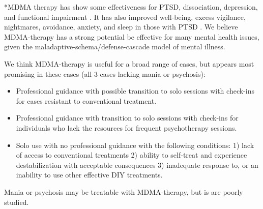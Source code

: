 \documentclass[12pt,letterpaper]{article}
\begin{document}
*MDMA therapy has show some effectiveness for PTSD, dissociation, depression, and functional impairment \cite{greenMeta}. It has also improved well-being, excess vigilance, nightmares, avoidance, anxiety, and sleep in those with PTSD \cite{smithSystematic}. We believe MDMA-therapy has a strong potential be effective for many mental health issues, given the maladaptive-schema/defense-cascade model of mental illness. 

We think MDMA-therapy is useful for a broad range of cases, but appears most promising in these cases (all 3 cases lacking mania or psychosis):
\begin{itemize}
    \item Professional guidance with possible transition to solo sessions with check-ins for cases resistant to conventional treatment.
    \item Professional guidance with transition to solo sessions with check-ins for individuals who lack the resources for frequent psychotherapy sessions.
    \item Solo use with no professional guidance with the following conditions: 1) lack of access to conventional treatments 2) ability to self-treat and experience destabilization with acceptable consequences 3) inadequate response to, or an inability to use other effective DIY treatments. 
\end{itemize}
Mania or psychosis may be treatable with MDMA-therapy, but is are poorly studied. 
\end{document}
